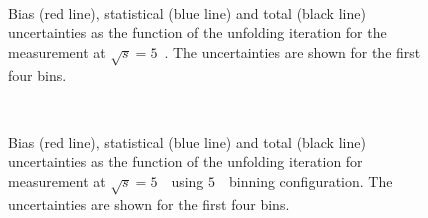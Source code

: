 \begin{figure}[h]
\centering
{}
\\
\caption{Bias (red line), statistical (blue line) and total (black line) uncertainties as the function of the unfolding iteration for the \ptdilep measurement at $\sqrt{s} = 5$~\TeV. The uncertainties are shown for the first four bins.}
\label{fig:biasunc_min_ptll_5}
\end{figure}

\begin{figure}[h]
\centering
{}
\\
\caption{Bias (red line), statistical (blue line) and total (black line) uncertainties as the function of the unfolding iteration for \ut measurement at $\sqrt{s} = 5$~\TeV\ using $5$~\GeV\ binning configuration. The uncertainties are shown for the first four bins.}
\label{fig:biasunc_min_uT5GeV_5}
\end{figure}
